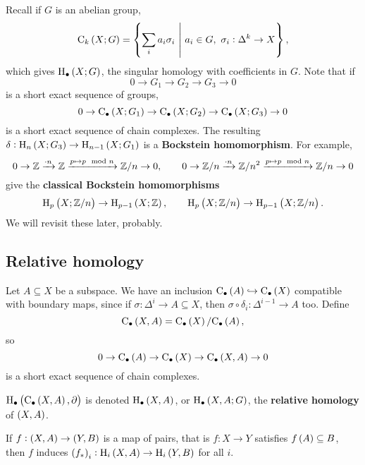 \begin{example*}
Recall if $ G $ is an abelian group,
$$ \C_k\br{X; G} = \cbr{\sum_i a_i\sigma_i \st a_i \in G, \ \sigma_i : \Delta^k \to X}, $$
which gives $ \H_\bullet\br{X; G} $, the singular homology with coefficients in $ G $. Note that if
$$ 0 \to G_1 \to G_2 \to G_3 \to 0 $$
is a short exact sequence of groups,
$$ 0 \to \C_\bullet\br{X; G_1} \to \C_\bullet\br{X; G_2} \to \C_\bullet\br{X; G_3} \to 0 $$
is a short exact sequence of chain complexes. The resulting $ \delta : \H_n\br{X; G_3} \to \H_{n - 1}\br{X; G_1} $ is a \textbf{Bockstein homomorphism}. For example,
$$ 0 \to \mathbb{Z} \xrightarrow{\cdot n} \mathbb{Z} \xrightarrow{p \mapsto p \mod n} \mathbb{Z} / n \to 0, \qquad 0 \to \mathbb{Z} / n \xrightarrow{\cdot n} \mathbb{Z} / n^2 \xrightarrow{p \mapsto p \mod n} \mathbb{Z} / n \to 0 $$
give the \textbf{classical Bockstein homomorphisms}
$$ \H_p\br{X; \ZZ / n} \to \H_{p - 1}\br{X; \ZZ}, \qquad \H_p\br{X; \ZZ / n} \to \H_{p - 1}\br{X; \ZZ / n}. $$
We will revisit these later, probably.
\end{example*}

\subsection{Relative homology}

\begin{example*}
Let $ A \subseteq X $ be a subspace. We have an inclusion $ \C_\bullet\br{A} \hookrightarrow \C_\bullet\br{X} $ compatible with boundary maps, since if $ \sigma : \Delta^i \to A \subseteq X $, then $ \sigma \circ \delta_i : \Delta^{i - 1} \to A $ too. Define
$$ \C_\bullet\br{X, A} = \C_\bullet\br{X} / \C_\bullet\br{A}, $$
so
$$ 0 \to \C_\bullet\br{A} \to \C_\bullet\br{X} \to \C_\bullet\br{X, A} \to 0 $$
is a short exact sequence of chain complexes.
\end{example*}

\begin{definition*}
$ \H_\bullet\br{\C_\bullet\br{X, A}, \da} $ is denoted $ \H_\bullet\br{X, A} $, or $ \H_\bullet\br{X, A; G} $, the \textbf{relative homology} of $ \br{X, A} $.
\end{definition*}

\pagebreak

\begin{lemma}
If $ f : \br{X, A} \to \br{Y, B} $ is a map of pairs, that is $ f : X \to Y $ satisfies $ f\br{A} \subseteq B $, then $ f $ induces $ \br{f_*}_i : \H_i\br{X, A} \to \H_i\br{Y, B} $ for all $ i $.
\end{lemma}

